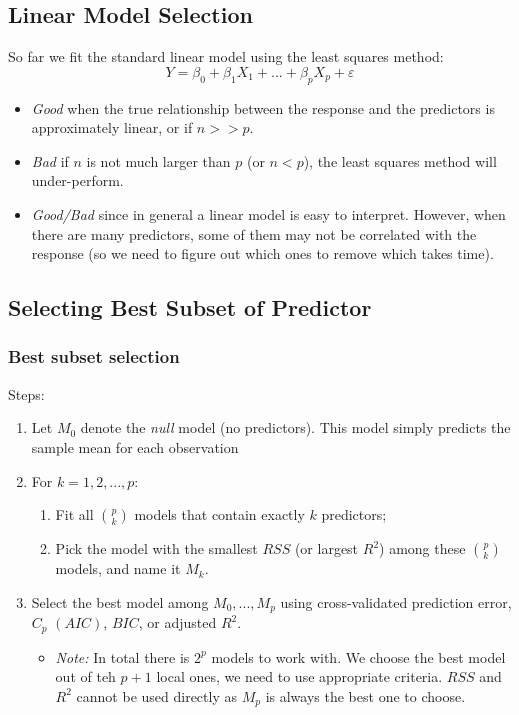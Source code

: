 \documentclass[11pt]{article}
\begin{document}
\subsection{Linear Model Selection}
\noindent So far we fit the standard linear model using the least squares method:
$$Y = \beta_0 + \beta_1 X_1 + ... + \beta_p X_p + \varepsilon$$
\begin{itemize}
    \item \textit{Good} when the true relationship between the response and the predictors is approximately linear, or if $n >> p$.
    \item \textit{Bad} if $n$ is not much larger than $p$ (or $n < p$), the least squares method will under-perform.
    \item \textit{Good/Bad} since in general a linear model is easy to interpret. However, when there are many predictors, some of them may not be correlated with the response (so we need to figure out which ones to remove which takes time).
\end{itemize}

\subsection{Selecting Best Subset of Predictor}
\subsubsection{Best subset selection}
\noindent Steps:
\begin{enumerate}
    \item Let $M_0$ denote the \textit{null} model (no predictors). This model simply predicts the sample mean for each observation
    \item For $k=1,2,...,p$:
        \begin{enumerate}
            \item Fit all $\binom{p}{k}$ models that contain exactly $k$ predictors;
            \item Pick the model with the smallest $RSS$ (or largest $R^2$) among these $\binom{p}{k}$ models, and name it $M_k$.
        \end{enumerate}
    \item Select the best model among $M_0,...,M_p$ using cross-validated prediction error, $C_p$ $(AIC)$, $BIC$, or adjusted $R^2$.
        \begin{itemize}
            \item \textit{Note:} In total there is $2^p$ models to work with. We choose the best model out of teh $p + 1$ local ones, we need to use appropriate criteria. $RSS$ and $R^2$ cannot be used directly as $M_p$ is always the best one to choose.
        \end{itemize}
\end{enumerate}
\end{document}
